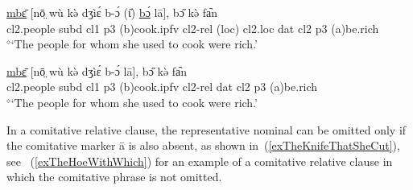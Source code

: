 \documentclass[10pt,twoside]{article}
\def\ci#1{{\ipaFont #1}}
\newcommand{\gl}[1]{`#1'}
\def\VSP{\vspace{0pt}}
\newcommand{\cl}[1]{{\sc cl#1}}
\newcommand{\pref}[1]{(\ref{#1})}
\def\elicited{$^\diamond$}
\def\ih{ɩ}
\begin{document}
\begin{exe}
\ex     \label{DativeWithAndWithoutResPro}
\begin{xlist}

	\ex \label{exThePeopleForWhomWithPro}	
		\gll \uline{mbɛ̄} [nō̤ wù kə̀ dʒìɛ́ b-ɔ́ ({\H\ih}) \uline{bɔ́} lā], bɔ̋ kə̀ fa᷆n	\\
		\cl2.people {\sc subd} \cl1  {\sc p3} ({\sc b})cook.{\sc ipfv} \cl2-{\sc rel} ({\sc loc}) \cl2.{\sc loc}  {\sc dat} \cl2  {\sc p3} ({\sc a})be.rich	\\
		\glt \VSP \elicited \gl{The people for whom she used to cook were rich.}

	\ex \label{exThePeopleForWhomOnlyPP}
		\gll \uline{mbɛ̄} [nō̤ wù kə̀ dʒìɛ́ b-ɔ́ lā], bɔ̋ kə̀ fa᷆n	\\
		\cl2.people {\sc subd} \cl1  {\sc p3} ({\sc b})cook.{\sc ipfv} \cl2-{\sc rel} {\sc dat} \cl2  {\sc p3} ({\sc a})be.rich	\\
		\glt \VSP \elicited \gl{The people for whom she used to cook were rich.}

\end{xlist}
\end{exe}

In a comitative relative clause, the representative nominal can be omitted only if the comitative marker \ci{ā} 
is also absent, as shown in~\pref{exTheKnifeThatSheCut}, see ~\pref{exTheHoeWithWhich} for an example of a comitative relative clause in which the comitative phrase is not omitted.

\end{document}
